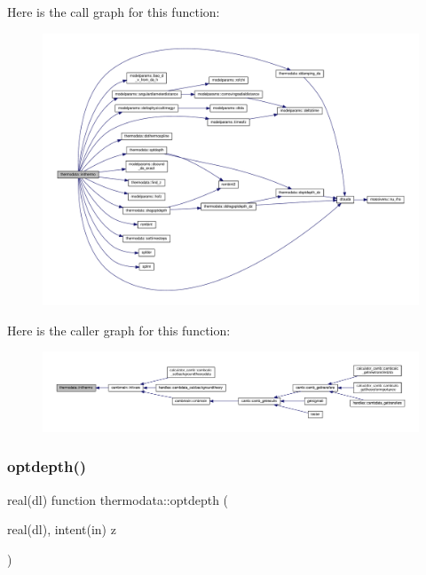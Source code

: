 Here is the call graph for this function\+:
\nopagebreak
\begin{figure}[H]
\begin{center}
\leavevmode
\includegraphics[width=350pt]{namespacethermodata_a6d995eb9ad9f563fec198222c168e097_cgraph}
\end{center}
\end{figure}
Here is the caller graph for this function\+:
\nopagebreak
\begin{figure}[H]
\begin{center}
\leavevmode
\includegraphics[width=350pt]{namespacethermodata_a6d995eb9ad9f563fec198222c168e097_icgraph}
\end{center}
\end{figure}
\mbox{\label{namespacethermodata_a3875da8b58196788145c8f6df6ea6cfe}} 
\subsubsection{\texorpdfstring{optdepth()}{optdepth()}}
{\footnotesize\ttfamily real(dl) function thermodata\+::optdepth (\begin{DoxyParamCaption}\item[{real(dl), intent(in)}]{z }\end{DoxyParamCaption})\hspace{0.3cm}{\ttfamily [private]}}



